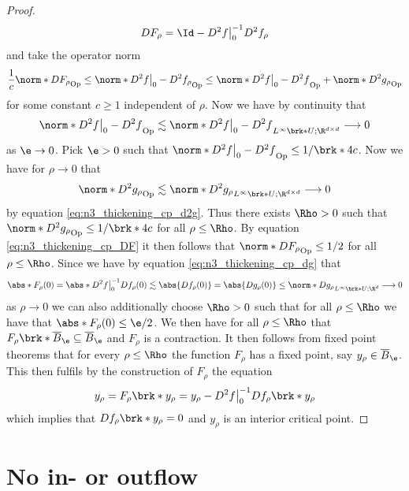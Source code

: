 \begin{proof}
\begin{align*}
    DF_\rho=\Id -D^2f\big\vert_0^{-1}D^2f_\rho
  \end{align*}
  and take the operator norm
  \begin{align}
    \frac{1}{c}\norm*{DF_\rho}_{\text{Op}}\leq\norm*{D^2f\big\vert_0-D^2f_\rho}_{\text{Op}}
    \leq \norm*{D^2f\big\vert_0-D^2f}_{\text{Op}}+\norm*{D^2g_\rho}_{\text{Op}}
    \label{eq:n3_thickening_cp_DF}
  \end{align}
  for some constant $c\geq1$ independent of $\rho$.
  Now we have by continuity that
  $$\norm*{D^2f\big\vert_0-D^2f}_{\text{Op}}\lesssim \norm*{D^2f\big\vert_0-D^2f}_{L^\infty\brk*{U;\R^{d\times d}}}\longrightarrow0$$
  as $\e\to0$.
  Pick $\e>0$ such that $\norm*{D^2f\big\vert_0-D^2f}_{\text{Op}}\leq 1/\brk*{4c}$.
  Now we have for $\rho\to0$ that 
  $$\norm*{D^2g_\rho}_{\text{Op}}\lesssim\norm*{D^2g_\rho}_{L^\infty\brk*{U;\R^{d\times d}}}\longrightarrow0$$
  by equation
  \eqref{eq:n3_thickening_cp_d2g}. Thus there exists $\Rho>0$ such that $\norm*{D^2g_\rho}_{\text{Op}}\leq1/\brk*{4c}$
  for all $\rho\leq\Rho$.
  By equation \eqref{eq:n3_thickening_cp_DF} it then follows that
  $\norm*{DF_\rho}_{\text{Op}}\leq 1/2$
  for all $\rho\leq\Rho$.
  Since we have by equation \eqref{eq:n3_thickening_cp_dg} that
  \begin{align*}
    \abs*{F_\rho(0)}=\abs*{D^2f\big\vert_0^{-1}Df_\rho(0)}
    \lesssim \abs{Df_\rho(0)}
    =\abs{Dg_\rho(0)}\leq\norm*{Dg_\rho}_{L^\infty\brk*{U;\R^d}}\longrightarrow0
  \end{align*}
  as $\rho\to0$ we can also additionally choose $\Rho>0$ such that for all $\rho\leq\Rho$ we have that
  $\abs*{F_\rho(0)}\leq \e/2$.
  We then have for all $\rho\leq\Rho$ that
  $F_\rho\brk*{\overline{B}_\e}\subseteq \overline{B}_\e$ and $F_\rho$ is a contraction.
  It then follows from fixed point theorems that for every $\rho\leq\Rho$
  the function $F_\rho$ has a fixed point, say $y_\rho\in \overline{B}_\e$. This then fulfils by the construction of $F_\rho$ the equation
  \begin{align*}
    y_\rho=F_\rho\brk*{y_\rho}=y_\rho-D^2f\big\vert_0^{-1}Df_\rho\brk*{y_\rho}
  \end{align*}
  which implies that $Df_\rho\brk*{y_\rho}=0$ and $y_\rho$ is an interior critical point.
\end{proof}



\chapter{No in- or outflow}
\label{ch:n2_hvf_noInflowNoOutflow}

